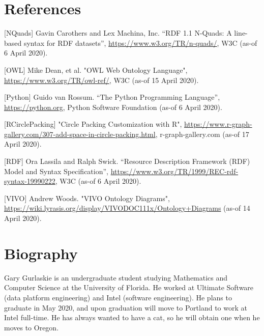 \documentclass[11pt]{article}
\begin{document}
\section*{References}

[NQuads] Gavin Carothers and Lex Machina, Inc. “RDF 1.1 N-Quads: A line-based syntax for RDF datasets”, \url{https://www.w3.org/TR/n-quads/}, W3C (as-of 6 April 2020).

[OWL] Mike Dean, et al. "OWL Web Ontology Language", \url{https://www.w3.org/TR/owl-ref/}, W3C (as-of 15 April 2020).

[Python] Guido van Rossum. “The Python Programming Language”, \url{https://python.org}, Python Software Foundation (as-of 6 April 2020).

[RCirclePacking] "Circle Packing Customization with R", \url{https://www.r-graph-gallery.com/307-add-space-in-circle-packing.html}, r-graph-gallery.com (as-of 17 April 2020).

[RDF] Ora Lassila and Ralph Swick. “Resource Description Framework (RDF) Model and Syntax Specification”, \url{https://www.w3.org/TR/1999/REC-rdf-syntax-19990222}, W3C (as-of 6 April 2020).

[VIVO] Andrew Woods. "VIVO Ontology Diagrams", \url{https://wiki.lyrasis.org/display/VIVODOC111x/Ontology+Diagrams} (as-of 14 April 2020).

\section*{Biography}
Gary Gurlaskie is an undergraduate student studying Mathematics and Computer Science at the University of Florida. He worked at Ultimate Software (data platform engineering) and Intel (software engineering). He plans to graduate in May 2020, and upon graduation will move to Portland to work at Intel full-time. He has always wanted to have a cat, so he will obtain one when he moves to Oregon.
\end{document}
